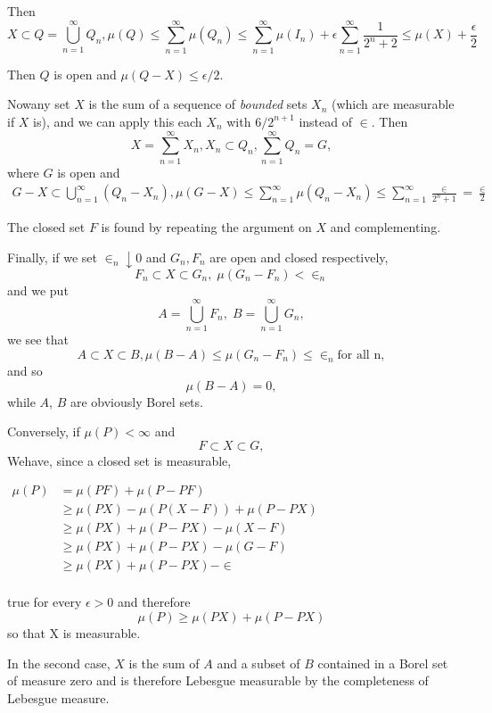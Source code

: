Then
$$
X \subset Q = \bigcup^{\infty}_{n=1} Q_n, \mu (Q)
\leq \sum^{\infty}_{n=1} \mu (Q_n) \leq
\sum^{\infty}_{n=1} \mu (I_n) + \epsilon
\sum^{\infty}_{n=1} \frac{1}{2^n + 2} \leq \mu (X)
+ \frac{\epsilon}{2}
$$ 

Then $Q$ is open and $\mu (Q -X)\leq  \epsilon/2$.

Now\pageoriginale any set $X$ is the sum of a sequence of \textit{bounded} sets $X_n$ (which
are measurable if $X$ is), and we can apply this each $X_n$ with
$6/2^{n+1}$ instead of $\in$. Then  
$$ 
X = \sum^{\infty}_{n=1} X_n, X_n \subset Q_n , \sum^{\infty}_{n=1} Q_n =G,
$$ 
where $G$ is open and  
\begin{gather*}
  G- X \subset \bigcup^{\infty}_{n=1} (Q_n - X_n),
  \mu (G -X) \leq \sum^{\infty}_{n=1} \mu (Q_n -
  X_n)\leq \sum^{\infty}_{n=1} \frac{\in}{2^n + 1}=\frac{\in}{2}
\end{gather*}

The closed set $F$ is found by repeating the argument on $X$ and complementing.

Finally, if we set $\in_n \downarrow 0$ and $G_n , F_n$ are open and
closed respectively, 
$$ 
F_n \subset X \subset G_n ,\; \mu (G_n - F_n) < \in_n 
$$
and we put
$$ 
A= \bigcup^{\infty}_{n=1} F_n,\; B= \bigcup^{\infty}_{n=1} G_n, 
$$
we see that 
$$ 
A \subset X \subset B, \mu (B -A) \leq \mu (G_n - F_n) \leq \in_n
\text{for all n},
$$
and so
$$ 
\mu (B- A) =0,
$$
while $A$, $B$ are obviously Borel sets.

Conversely, if $\mu (P) < \infty$ and
$$ 
F \subset X \subset G,
$$
We\pageoriginale have, since a closed set is measurable, 

$
\begin{aligned}
\mu (P) & = \mu (PF) + \mu (P-PF)\\
        & \geq \mu (PX) - \mu (P(X-F)) + \mu (P-PX)\\
        & \geq \mu (PX) +\mu (P - PX) - \mu (X - F)\\
        & \geq \mu (PX) + \mu (P-PX) - \mu (G - F)\\
        & \geq \mu (PX) + \mu (P -PX) -\in\\
\end{aligned}
$ 

true for every $\epsilon > 0$ and therefore
$$
\mu (P) \geq \mu (PX) + \mu (P - PX)
$$
so that X is measurable.

In the second case, $X$ is the sum of $A$ and a subset of $B$ contained in a
Borel set of measure zero and is therefore Lebesgue measurable by the
completeness of Lebesgue measure. 

